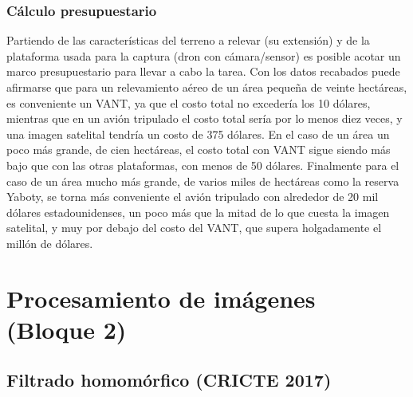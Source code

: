 \subsubsection{Cálculo presupuestario}
Partiendo de las características del terreno a relevar (su extensión) y de la plataforma usada para la captura (dron con cámara/sensor) es posible acotar un marco presupuestario para llevar a cabo la tarea. Con los datos recabados puede afirmarse que para un relevamiento aéreo de un área pequeña de veinte hectáreas, es conveniente un VANT, ya que el costo total no excedería los 10 dólares, mientras que en un avión tripulado el costo total sería por lo menos diez veces, y una imagen satelital tendría un costo de 375 dólares. En el caso de un área un poco más grande, de cien hectáreas, el costo total con VANT sigue siendo más bajo que con las otras plataformas, con menos de 50 dólares. Finalmente para el caso de un área mucho más grande, de varios miles de hectáreas como la reserva Yaboty, se torna más conveniente el avión tripulado con alrededor de 20 mil dólares estadounidenses, un poco más que la mitad de lo que cuesta la imagen satelital, y muy por debajo del costo del VANT, que supera holgadamente el millón de dólares.



\section{Procesamiento de imágenes (Bloque 2)}

\subsection{Filtrado homomórfico (CRICTE 2017)}
